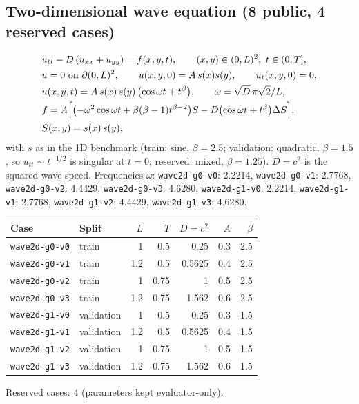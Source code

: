 \documentclass[11pt]{article}
\begin{document}
\subsection{Two-dimensional wave equation (8 public, 4 reserved cases)}
\begin{align*}
&u_{tt} - D\,(u_{xx}+u_{yy}) = f(x,y,t),\qquad (x,y)\in(0,L)^2,\ t\in(0,T],\\
&u = 0 \text{ on } \partial(0,L)^2,\qquad u(x,y,0)=A\,s(x)s(y),\qquad u_t(x,y,0)=0,\\
&u(x,y,t) = A\,s(x)\,s(y)\,\bigl(\cos\omega t + t^{\beta}\bigr),\qquad \omega=\sqrt{D}\,\pi\sqrt{2}/L,\\
&f = A\Bigl[\bigl(-\omega^2\cos\omega t+\beta(\beta-1)t^{\beta-2}\bigr)S
   - D\bigl(\cos\omega t+t^{\beta}\bigr)\Delta S\Bigr],\\
&S(x,y)=s(x)\,s(y),
\end{align*}
with $s$ as in the 1D benchmark (train: sine, $\beta=2.5$; validation: quadratic, $\beta=1.5$, so
$u_{tt}\sim t^{-1/2}$ is singular at $t=0$; reserved: mixed, $\beta=1.25$). $D=c^2$ is the squared wave speed.
\noindent Frequencies $\omega$: \texttt{wave2d-g0-v0}: 2.2214, \texttt{wave2d-g0-v1}: 2.7768, \texttt{wave2d-g0-v2}: 4.4429, \texttt{wave2d-g0-v3}: 4.6280, \texttt{wave2d-g1-v0}: 2.2214, \texttt{wave2d-g1-v1}: 2.7768, \texttt{wave2d-g1-v2}: 4.4429, \texttt{wave2d-g1-v3}: 4.6280.

\begin{center}\small
\begin{tabular}{llrrrrr}
\toprule
Case & Split & $L$ & $T$ & $D=c^2$ & $A$ & $\beta$ \\
\midrule
\texttt{wave2d-g0-v0} & train & 1 & 0.5 & 0.25 & 0.3 & 2.5 \\
\texttt{wave2d-g0-v1} & train & 1.2 & 0.5 & 0.5625 & 0.4 & 2.5 \\
\texttt{wave2d-g0-v2} & train & 1 & 0.75 & 1 & 0.5 & 2.5 \\
\texttt{wave2d-g0-v3} & train & 1.2 & 0.75 & 1.562 & 0.6 & 2.5 \\
\texttt{wave2d-g1-v0} & validation & 1 & 0.5 & 0.25 & 0.3 & 1.5 \\
\texttt{wave2d-g1-v1} & validation & 1.2 & 0.5 & 0.5625 & 0.4 & 1.5 \\
\texttt{wave2d-g1-v2} & validation & 1 & 0.75 & 1 & 0.5 & 1.5 \\
\texttt{wave2d-g1-v3} & validation & 1.2 & 0.75 & 1.562 & 0.6 & 1.5 \\
\bottomrule
\end{tabular}
\end{center}
\noindent Reserved cases: 4 (parameters kept evaluator-only).
\end{document}
